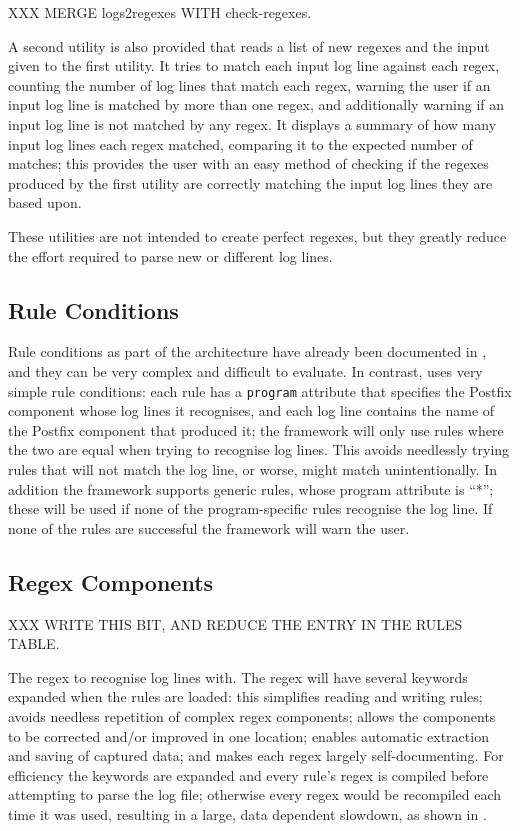 XXX MERGE logs2regexes WITH check-regexes.

A second utility is also provided that reads a list of new regexes and
the input given to the first utility.  It tries to match each input log
line against each regex, counting the number of log lines that match
each regex, warning the user if an input log line is matched by more
than one regex, and additionally warning if an input log line is not
matched by any regex.  It displays a summary of how many input log lines
each regex matched, comparing it to the expected number of matches; this
provides the user with an easy method of checking if the regexes
produced by the first utility are correctly matching the input log lines
they are based upon.

These utilities are not intended to create perfect regexes, but they
greatly reduce the effort required to parse new or different log lines.

\subsection{Rule Conditions}

\label{rule conditions in implementation}

Rule conditions as part of the architecture have already been documented in
, and they can be very complex
and difficult to evaluate.  In contrast, \parsername{} uses very simple
rule conditions: each rule has a \texttt{program} attribute that specifies
the Postfix component whose log lines it recognises, and each log line
contains the name of the Postfix component that produced it; the framework
will only use rules where the two are equal when trying to recognise log
lines.  This avoids needlessly trying rules that will not match the log
line, or worse, might match unintentionally.  In addition the framework
supports generic rules, whose program attribute is ``*''; these will be
used if none of the program-specific rules recognise the log line.  If none
of the rules are successful the framework will warn the user.

\subsection{Regex Components}

XXX WRITE THIS BIT, AND REDUCE THE ENTRY IN THE RULES TABLE\@.

    The regex to recognise log lines with.  The regex will
        have several keywords expanded when the rules are loaded: this
        simplifies reading and writing rules; avoids needless repetition of
        complex regex components; allows the components to be corrected
        and/or improved in one location; enables automatic extraction and
        saving of captured data; and makes each regex largely
        self-documenting.  For efficiency the keywords are expanded and
        every rule's regex is compiled before attempting to parse the log
        file; otherwise every regex would be recompiled each time it was
        used, resulting in a large, data dependent slowdown, as shown in
        .


